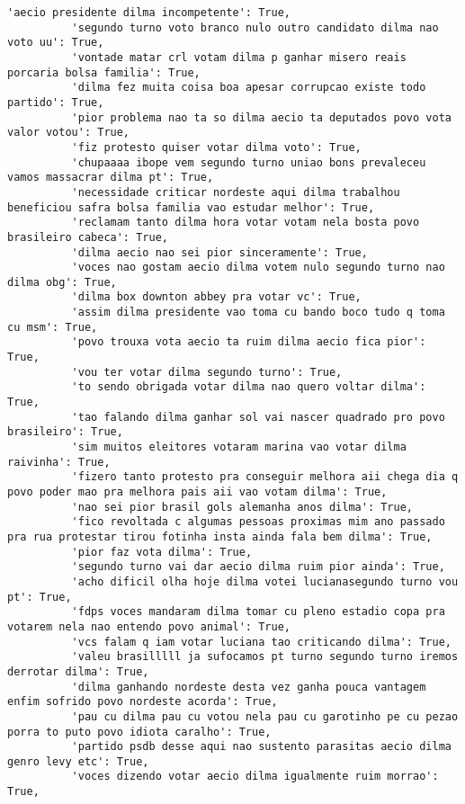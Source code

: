\documentclass[11pt]{article}
\begin{document}
\begin{Verbatim}[commandchars=\\\{\}]
          'aecio presidente dilma incompetente': True,
          'segundo turno voto branco nulo outro candidato dilma nao voto uu': True,
          'vontade matar crl votam dilma p ganhar misero reais porcaria bolsa familia': True,
          'dilma fez muita coisa boa apesar corrupcao existe todo partido': True,
          'pior problema nao ta so dilma aecio ta deputados povo vota valor votou': True,
          'fiz protesto quiser votar dilma voto': True,
          'chupaaaa ibope vem segundo turno uniao bons prevaleceu vamos massacrar dilma pt': True,
          'necessidade criticar nordeste aqui dilma trabalhou beneficiou safra bolsa familia vao estudar melhor': True,
          'reclamam tanto dilma hora votar votam nela bosta povo brasileiro cabeca': True,
          'dilma aecio nao sei pior sinceramente': True,
          'voces nao gostam aecio dilma votem nulo segundo turno nao dilma obg': True,
          'dilma box downton abbey pra votar vc': True,
          'assim dilma presidente vao toma cu bando boco tudo q toma cu msm': True,
          'povo trouxa vota aecio ta ruim dilma aecio fica pior': True,
          'vou ter votar dilma segundo turno': True,
          'to sendo obrigada votar dilma nao quero voltar dilma': True,
          'tao falando dilma ganhar sol vai nascer quadrado pro povo brasileiro': True,
          'sim muitos eleitores votaram marina vao votar dilma raivinha': True,
          'fizero tanto protesto pra conseguir melhora aii chega dia q povo poder mao pra melhora pais aii vao votam dilma': True,
          'nao sei pior brasil gols alemanha anos dilma': True,
          'fico revoltada c algumas pessoas proximas mim ano passado pra rua protestar tirou fotinha insta ainda fala bem dilma': True,
          'pior faz vota dilma': True,
          'segundo turno vai dar aecio dilma ruim pior ainda': True,
          'acho dificil olha hoje dilma votei lucianasegundo turno vou pt': True,
          'fdps voces mandaram dilma tomar cu pleno estadio copa pra votarem nela nao entendo povo animal': True,
          'vcs falam q iam votar luciana tao criticando dilma': True,
          'valeu brasilllll ja sufocamos pt turno segundo turno iremos derrotar dilma': True,
          'dilma ganhando nordeste desta vez ganha pouca vantagem enfim sofrido povo nordeste acorda': True,
          'pau cu dilma pau cu votou nela pau cu garotinho pe cu pezao porra to puto povo idiota caralho': True,
          'partido psdb desse aqui nao sustento parasitas aecio dilma genro levy etc': True,
          'voces dizendo votar aecio dilma igualmente ruim morrao': True,

\end{Verbatim}
\end{document}
